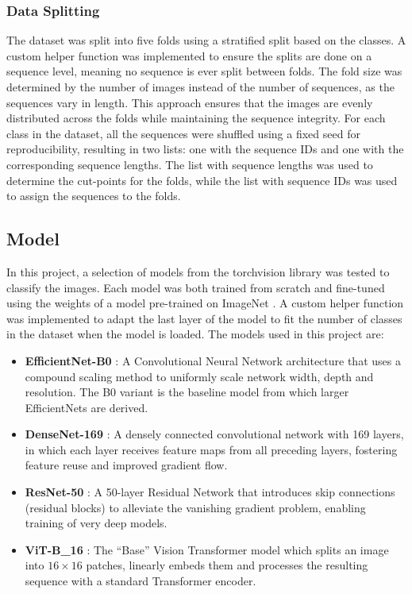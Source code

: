     \subsubsection{Data Splitting}
    The dataset was split into five folds using a stratified split based on the classes.
    A custom helper function was implemented to ensure the splits are done on a sequence level, meaning no sequence is ever split between folds.
    The fold size was determined by the number of images instead of the number of sequences, as the sequences vary in length.
    This approach ensures that the images are evenly distributed across the folds while maintaining the sequence integrity.
    For each class in the dataset, all the sequences were shuffled using a fixed seed for reproducibility, resulting in two lists: one with the sequence IDs and one with the corresponding sequence lengths.
    The list with sequence lengths was used to determine the cut-points for the folds, while the list with sequence IDs was used to assign the sequences to the folds.


    \subsection{Model}
    In this project, a selection of models from the torchvision library was tested to classify the images.
    Each model was both trained from scratch and fine-tuned using the weights of a model pre-trained on ImageNet \autocite{dengImageNetLargescaleHierarchical2009}.
    A custom helper function was implemented to adapt the last layer of the model to fit the number of classes in the dataset when the model is loaded.
    The models used in this project are:

    \begin{itemize}
        \item \textbf{EfficientNet-B0} \autocite{tanEfficientNetRethinkingModel2019}:  
        A Convolutional Neural Network architecture that uses a compound scaling method to uniformly scale network width, depth and resolution.  
        The B0 variant is the baseline model from which larger EfficientNets are derived.  

        \item \textbf{DenseNet-169} \autocite{huangDenselyConnectedConvolutional2017}:  
        A densely connected convolutional network with 169 layers, in which each layer receives feature maps from all preceding layers, fostering feature reuse and improved gradient flow.  

        \item \textbf{ResNet-50} \autocite{heDeepResidualLearning2016}:  
        A 50-layer Residual Network that introduces skip connections (residual blocks) to alleviate the vanishing gradient problem, enabling training of very deep models.  

        \item \textbf{ViT-B\_16} \autocite{dosovitskiyImageWorth16x162021}:  
        The “Base” Vision Transformer model which splits an image into \(16\times 16\) patches, linearly embeds them and processes the resulting sequence with a standard Transformer encoder.  
    \end{itemize}

